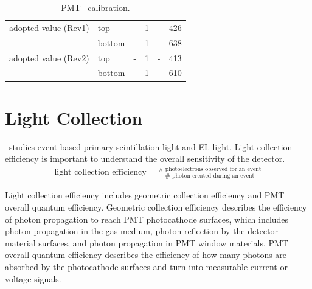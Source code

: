 \begin{table}[!h]
\begin{tabular}[!h]{ | m{10em} ||m{5em} |m{5em} | m{5em} | m{5em}| m{5em}|}
		\hline
adopted value (Rev1)& top & - & 1  & - & \num{426}   \\\cline{2-6}& bottom & - & 1  & - & \num{638}\\\hline %
adopted value (Rev2)& top & - & 1  & - & \num{413}   \\\cline{2-6}& bottom & - & 1  & - & \num{610}\\\hline %

	\end{tabular}
	
	\caption[PMT calibration.]{PMT \sphe\ calibration. 
	}
 \label{tab:PMTparameters}
	\end{table}

\section{Light Collection}
\label{sec:gtest light collection}
\gtest\ studies event-based primary scintillation light and EL light. Light collection efficiency is important to understand the overall sensitivity of the detector.  
\begin{align}
\text{light collection efficiency} = \frac{\text{\#\  photoelectrons observed for an event}}{\text{\#\  photon created during an event}}
\end{align}

Light collection efficiency includes geometric collection efficiency and PMT overall quantum efficiency. Geometric collection efficiency describes the efficiency of photon propagation to reach PMT photocathode surfaces, which includes photon propagation in the gas medium, photon reflection by the detector material surfaces, and photon propagation in PMT window materials. PMT overall quantum efficiency describes the efficiency of how many photons are absorbed by the photocathode surfaces and turn into measurable current or voltage signals.

